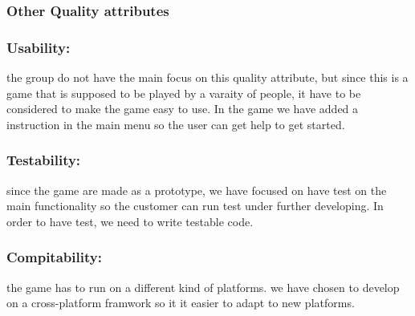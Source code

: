 \subsubsection{Other Quality attributes}
\subsubsection*{Usability: } the group do not have the main focus on this quality attribute, 
but since this is a game that is supposed to be played by a varaity of people, it
have to be considered to make the game easy to use. In the game we have added a 
instruction in the main menu so the user can get help to get started.

\subsubsection*{Testability: } since the game are made as a prototype, we have focused on have
test on the main functionality so the customer can run test under further developing.
In order to have test, we need to write testable code.

\subsubsection*{Compitability: } the game has to run on a different kind of platforms. we
have chosen to develop on a cross-platform framwork so it it easier to adapt to 
new platforms.
